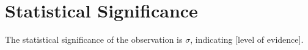 \section{Statistical Significance}
\label{sec:RESULTS_STATISTICAL_SIGNIFICANCE}

The statistical significance of the observation is \resExampleSignificance$\sigma$, indicating [level of evidence].

